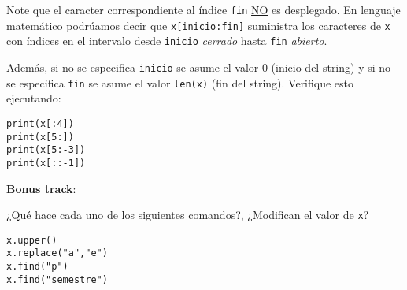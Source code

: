 \documentclass[11pt]{exam}
\begin{document}
\begin{questions}
Note que el caracter correspondiente al índice \texttt{fin} \underline{NO} es desplegado. En lenguaje matemático podrúamos decir que \texttt{x[inicio:fin]} suministra los caracteres de \texttt{x} con índices en el intervalo desde \texttt{inicio} \textit{cerrado} hasta \texttt{fin} \textit{abierto}.

\item Además, si no se especifica \texttt{inicio} se asume el valor 0 (inicio del string) y si no se especifica \texttt{fin} se asume el valor \texttt{len(x)} (fin del string). Verifique esto ejecutando:

\begin{verbatim}
print(x[:4])
print(x[5:])
print(x[5:-3])
print(x[::-1])
\end{verbatim}

\item \textbf{Bonus track}: 

¿Qué hace cada uno de los siguientes comandos?, ¿Modifican el valor de \texttt{x}?

\begin{verbatim}
x.upper()
x.replace("a","e")
x.find("p")
x.find("semestre")
\end{verbatim}


\end{questions}
\end{document}
